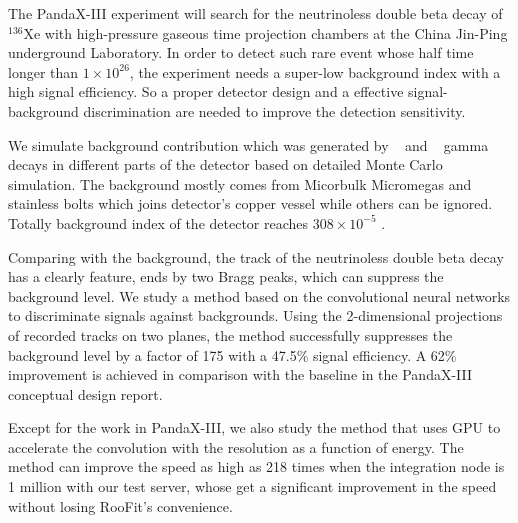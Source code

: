 \begin{eabstract}
    The PandaX-III experiment will search for the neutrinoless double beta decay of $^{136}$Xe with high-pressure gaseous time projection chambers at the China Jin-Ping underground Laboratory. In order to detect such rare event whose half time longer than $1\times10^{26}$, the experiment needs a super-low background index with a high signal efficiency. So a proper detector design and a effective signal-background discrimination are needed to improve the detection sensitivity.

    We simulate background contribution which was generated by \utte~ and \thttt~ gamma decays in different parts of the detector based on detailed Monte Carlo simulation. The background mostly comes from Micorbulk Micromegas and stainless bolts which joins detector's copper vessel while others can be ignored. Totally background index of the detector reaches $308\times 10^{-5}$ \ckky.

    Comparing with the background, the track of the neutrinoless double beta decay has a clearly feature,  ends by two Bragg peaks, which can suppress the background level. We study a method based on the convolutional neural networks to discriminate signals against backgrounds. Using the 2-dimensional projections of recorded tracks on two planes, the method successfully suppresses the background level by a factor of 175 with a 47.5\% signal efficiency. A 62\% improvement is achieved in comparison with the baseline in the PandaX-III conceptual design report.

    Except for the work in PandaX-III, we also study the method that uses GPU to accelerate the convolution with the resolution as a function of energy. The method can improve the speed as high as 218 times when the integration node is 1 million with our test server, whose get a significant improvement in the speed without losing RooFit's convenience. 

\end{eabstract}

